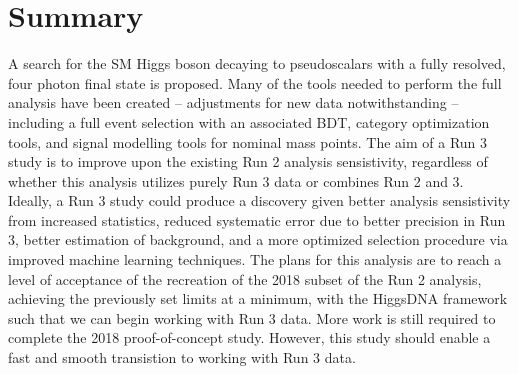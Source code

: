 \documentclass[12pt]{article}
\begin{document}
\section{Summary}
A search for the SM Higgs boson decaying to pseudoscalars with a fully resolved, four photon final state is proposed. Many of the tools needed to perform the full analysis have been created -- adjustments for new data notwithstanding -- including a full event selection with an associated BDT, category optimization tools, and signal modelling tools for nominal mass points. The aim of a Run 3 study is to improve upon the existing Run 2 analysis sensistivity, regardless of whether this analysis utilizes purely Run 3 data or combines Run 2 and 3. Ideally, a Run 3 study could produce a discovery given better analysis sensistivity from increased statistics, reduced systematic error due to better precision in Run 3, better estimation of background, and a more optimized selection procedure via improved machine learning techniques. The plans for this analysis are to reach a level of acceptance of the recreation of the 2018 subset of the Run 2 analysis, achieving the previously set limits at a minimum, with the HiggsDNA framework such that we can begin working with Run 3 data. More work is still required to complete the 2018 proof-of-concept study. However, this study should enable a fast and smooth transistion to working with Run 3 data.\par

\newpage
\printbibliography
\end{document}
